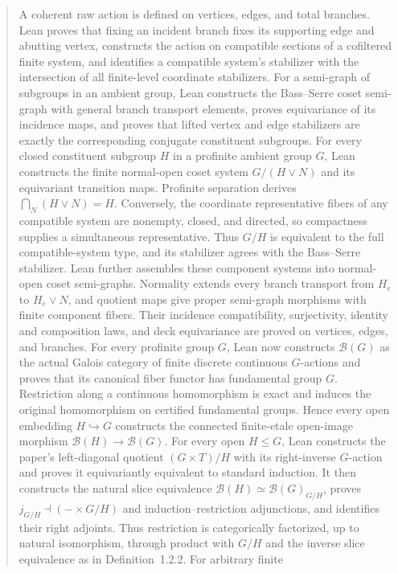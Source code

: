 \documentclass[11pt]{article}
\theoremstyle{plain}
\theoremstyle{definition}
\theoremstyle{remark}
\begin{document}
\begin{abstract}
A coherent raw action is defined on vertices, edges, and total branches.
Lean proves that fixing an incident branch fixes its supporting edge and
abutting vertex, constructs the action on compatible sections of a cofiltered
finite system, and identifies a compatible system's stabilizer with the
intersection of all finite-level coordinate stabilizers.  For a semi-graph of
subgroups in an ambient group, Lean constructs the Bass--Serre coset
semi-graph with general branch transport elements, proves equivariance of its
incidence maps, and proves that lifted vertex and edge stabilizers are exactly
the corresponding conjugate constituent subgroups.  For every closed
constituent subgroup $H$ in a profinite ambient group $G$, Lean constructs the
finite normal-open coset system $G/(H\vee N)$ and its equivariant transition
maps.  Profinite separation derives $\bigcap_N(H\vee N)=H$.  Conversely, the
coordinate representative fibers of any compatible system are nonempty,
closed, and directed, so compactness supplies a simultaneous representative.
Thus $G/H$ is equivalent to the full compatible-system type, and its
stabilizer agrees with the Bass--Serre stabilizer.  Lean further assembles
these component systems
into normal-open coset semi-graphs.  Normality extends every branch transport
from $H_e$ to $H_e\vee N$, and quotient maps give proper semi-graph morphisms
with finite component fibers.  Their incidence compatibility, surjectivity,
identity and composition laws, and deck equivariance are proved on vertices,
edges, and branches.  For every profinite group $G$, Lean now constructs
$\mathcal B(G)$ as the actual Galois category of finite discrete continuous
$G$-actions and proves that its canonical fiber functor has fundamental group
$G$.  Restriction along a continuous homomorphism is exact and induces the
original homomorphism on certified fundamental groups.  Hence every open
embedding $H\hookrightarrow G$ constructs the connected finite-etale
open-image morphism $\mathcal B(H)\to\mathcal B(G)$.  For every open
$H\leq G$, Lean constructs the paper's left-diagonal quotient
$(G\times T)/H$ with its right-inverse $G$-action and proves it equivariantly
equivalent to standard induction.  It then constructs the natural slice
equivalence $\mathcal B(H)\simeq\mathcal B(G)_{G/H}$, proves
$j_{G/H}\dashv(-\times G/H)$ and induction--restriction adjunctions, and
identifies their right adjoints.  Thus restriction is categorically
factorized, up to natural isomorphism, through product with $G/H$ and the
inverse slice equivalence as in Definition~1.2.2.  For arbitrary finite

\end{abstract}
\end{document}
